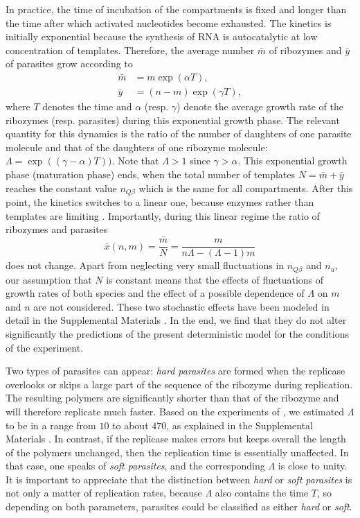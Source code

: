\documentclass[twocolumn,showpacs,floatfix]{revtex4-1}
\newcommand{\xb}{{\bar x}}
\newcommand{\be}{\begin{equation}}
\newcommand{\ee}{\end{equation}}
\begin{document}
In practice, the time of incubation of the compartments is fixed and longer than the time after 
which activated nucleotides become exhausted. 
The kinetics is initially exponential because the synthesis of 
RNA is autocatalytic at low concentration of templates. 
Therefore, the average number  
${\bar m}$ of ribozymes and ${\bar y}$ of parasites grow according to 
\begin{equation}
\begin{split}
\bar{m}&=m \exp (\alpha T),\\
\bar{y}&=(n - m ) \exp (\gamma T),
\end{split}
\label{deterministic eqs}
\end{equation}
where $T$ denotes the time and $\alpha$ (resp. $\gamma$) denote the average growth rate of the ribozymes 
(resp. parasites) during this exponential growth phase.
The relevant quantity for this dynamics is the ratio of
the number of daughters of one parasite molecule 
and that of the daughters of
one ribozyme molecule:  $\Lambda=\exp ((\gamma - \alpha) T ))$. 
Note that $\Lambda >1$ since $\gamma > \alpha$. 
This exponential growth phase (maturation phase) ends, 
when the total number of templates $N=\bar{m}+\bar{y}$ 
reaches the constant value $n_{Q \beta}$ which is the same for all compartments. 
After this point, the kinetics switches to a linear one, because 
enzymes rather than templates are limiting \cite{Spiegelman1965}. 
Importantly, during this linear regime   
the ratio of ribozymes and parasites 
\be
\xb(n,m)=\frac{\bar{m}}{N}=\frac{m}{n \Lambda - (\Lambda -1) m}
\label{xb}
\ee
does not change.
Apart from neglecting very small fluctuations in $n_{Q\beta}$ and $n_u$, 
our assumption that $N$ is constant means that the effects of fluctuations of growth rates of both species 
and the effect of a possible dependence of $\Lambda$ on $m$ and $n$ are not considered. 
These two stochastic effects have been modeled in detail in the Supplemental Materials \cite{SM}. In the end, 
we find that they do not alter significantly the predictions of the present deterministic model
for the conditions of the experiment.

Two types of parasites can appear: {\it hard parasites} are formed when the replicase overlooks or 
skips a large part of the sequence of the ribozyme during replication. The resulting polymers are significantly 
shorter than that of the ribozyme and will therefore replicate much faster. 
Based on the experiments of \cite{Matsumura2016}, 
we estimated $\Lambda$ to be in a range from $10$ to about $470$, as 
explained in the Supplemental Materials \cite{SM}. 
In contrast, if the replicase makes errors but keeps overall the length of the polymers unchanged, then  %
the replication time is essentially unaffected. In that case, one speaks of {\it soft parasites}, and 
the corresponding $\Lambda$ is close to unity.
It is important to appreciate that the distinction between {\it hard} or {\it soft parasites} is not only 
a matter of replication rates, 
because $\Lambda$ also contains the time $T$, so depending on both parameters, 
parasites could be classified as either {\it hard} or {\it soft}.
\end{document}
